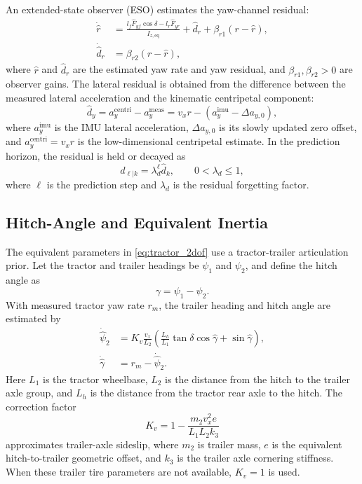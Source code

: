 An extended-state observer (ESO) estimates the yaw-channel residual:
\begin{equation}
\begin{aligned}
    \dot{\hat r} &= \frac{l_f\hat F_{yf}\cos\delta-l_r\hat F_{yr}}{I_{z,\mathrm{eq}}}
    +\hat d_r+\beta_{r1}(r-\hat r),\\
    \dot{\hat d}_r &= \beta_{r2}(r-\hat r),
\end{aligned}
\label{eq:eso_full}
\end{equation}
where $\hat r$ and $\hat d_r$ are the estimated yaw rate and yaw residual, and $\beta_{r1},\beta_{r2}>0$ are observer gains. The lateral residual is obtained from the difference between the measured lateral acceleration and the kinematic centripetal component:
\begin{equation}
    \hat d_y = a_y^{\mathrm{centri}}-a_y^{\mathrm{meas}}
    = v_x r-(a_y^{\mathrm{imu}}-\Delta a_{y,0}),
    \label{eq:lateral_residual}
\end{equation}
where $a_y^{\mathrm{imu}}$ is the IMU lateral acceleration, $\Delta a_{y,0}$ is its slowly updated zero offset, and $a_y^{\mathrm{centri}}=v_xr$ is the low-dimensional centripetal estimate. In the prediction horizon, the residual is held or decayed as
\begin{equation}
    \hat d_{\ell|k}=\lambda_d^\ell \hat d_k,\qquad 0<\lambda_d\leq1,
    \label{eq:eso_decay}
\end{equation}
where $\ell$ is the prediction step and $\lambda_d$ is the residual forgetting factor.

\subsection{Hitch-Angle and Equivalent Inertia}
\label{equivalent_inertia_hitch_angle}
The equivalent parameters in \eqref{eq:tractor_2dof} use a tractor-trailer articulation prior. Let the tractor and trailer headings be $\psi_1$ and $\psi_2$, and define the hitch angle as
\begin{equation}
    \gamma=\psi_1-\psi_2 .
\end{equation}
With measured tractor yaw rate $r_m$, the trailer heading and hitch angle are estimated by
\begin{equation}
\begin{aligned}
    \dot{\hat\psi}_2 &=
    K_v\frac{v_x}{L_2}\left(\frac{L_h}{L_1}\tan\delta\cos\hat\gamma+\sin\hat\gamma\right),\\
    \dot{\hat\gamma} &= r_m-\dot{\hat\psi}_2 .
\end{aligned}
\label{eq:hitch_estimator}
\end{equation}
Here $L_1$ is the tractor wheelbase, $L_2$ is the distance from the hitch to the trailer axle group, and $L_h$ is the distance from the tractor rear axle to the hitch. The correction factor
\begin{equation}
    K_v=1-\frac{m_2v_x^2e}{L_1L_2k_3}
    \label{eq:hitch_ckds}
\end{equation}
approximates trailer-axle sideslip, where $m_2$ is trailer mass, $e$ is the equivalent hitch-to-trailer geometric offset, and $k_3$ is the trailer axle cornering stiffness. When these trailer tire parameters are not available, $K_v=1$ is used.


